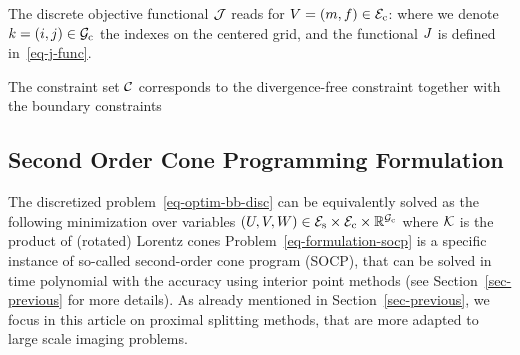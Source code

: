 The discrete objective functional $\mathcal{J}$ reads for $V=(m,f) \in \mathcal{E}_{\text{c}}$:
where we denote $k=(i,j) \in \mathcal{G}_{\text{c}}$ the indexes on the centered grid, and the functional $J$ is defined in~\eqref{eq-j-func}.

The constraint set $\mathcal{C}$ corresponds to the divergence-free constraint together with the boundary constraints



\subsection{Second Order Cone Programming Formulation}
\label{sec-socp}

The discretized problem~\eqref{eq-optim-bb-disc} can be equivalently solved as the following minimization over variables $(U,V,W) \in \mathcal{E}_{\text{s}} \times \mathcal{E}_{\text{c}} \times \mathbb{R}^{\mathcal{G}_{\text{c}}}$
where $\mathcal{K}$ is the product of (rotated) Lorentz cones 
Problem~\eqref{eq-formulation-socp} is a specific instance of so-called second-order cone program (SOCP), that can be solved in time polynomial with the accuracy using interior point methods (see Section~\ref{sec-previous} for more details). As already mentioned in Section~\ref{sec-previous}, we focus in this article on proximal splitting methods, that are more adapted to large scale imaging problems. 



